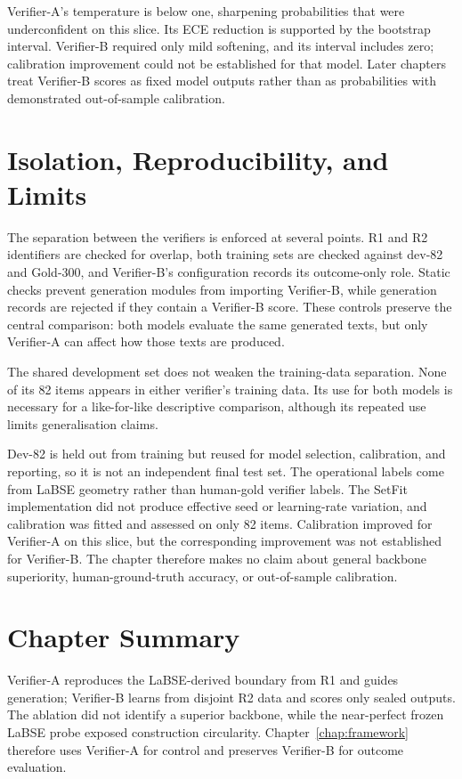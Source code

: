 Verifier-A's temperature is below one, sharpening probabilities that were underconfident on this slice. Its ECE reduction is supported by the bootstrap interval. Verifier-B required only mild softening, and its interval includes zero; calibration improvement could not be established for that model. Later chapters treat Verifier-B scores as fixed model outputs rather than as probabilities with demonstrated out-of-sample calibration.

\section{Isolation, Reproducibility, and Limits}

The separation between the verifiers is enforced at several points. R1 and R2 identifiers are checked for overlap, both training sets are checked against dev-82 and Gold-300, and Verifier-B's configuration records its outcome-only role. Static checks prevent generation modules from importing Verifier-B, while generation records are rejected if they contain a Verifier-B score. These controls preserve the central comparison: both models evaluate the same generated texts, but only Verifier-A can affect how those texts are produced.

The shared development set does not weaken the training-data separation. None of its 82 items appears in either verifier's training data. Its use for both models is necessary for a like-for-like descriptive comparison, although its repeated use limits generalisation claims.

Dev-82 is held out from training but reused for model selection, calibration, and reporting, so it is not an independent final test set. The operational labels come from LaBSE geometry rather than human-gold verifier labels. The SetFit implementation did not produce effective seed or learning-rate variation, and calibration was fitted and assessed on only 82 items. Calibration improved for Verifier-A on this slice, but the corresponding improvement was not established for Verifier-B. The chapter therefore makes no claim about general backbone superiority, human-ground-truth accuracy, or out-of-sample calibration.

\section{Chapter Summary}

Verifier-A reproduces the LaBSE-derived boundary from R1 and guides generation; Verifier-B learns from disjoint R2 data and scores only sealed outputs. The ablation did not identify a superior backbone, while the near-perfect frozen LaBSE probe exposed construction circularity. Chapter~\ref{chap:framework} therefore uses Verifier-A for control and preserves Verifier-B for outcome evaluation.
